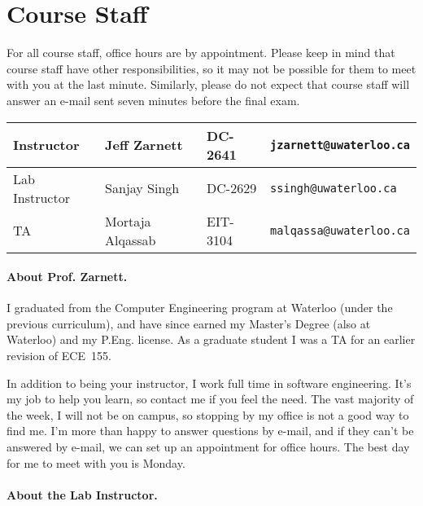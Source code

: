 \documentclass[letterpaper,10pt]{article}
\begin{document}
\section*{Course Staff}

For all course staff, office hours are by appointment. Please keep in mind that course staff have other responsibilities, so it may not be possible for them to meet with you at the last minute. Similarly, please do not expect that course staff will answer an e-mail sent seven minutes before the final exam.

\begin{table}[h]
        \begin{center}
        \begin{tabular}{l|l|l|l}
                                        Instructor & Jeff Zarnett & DC-2641 & \texttt{jzarnett@uwaterloo.ca} \\
                                        \hline
                                        Lab Instructor & Sanjay Singh & DC-2629 & \texttt{ssingh@uwaterloo.ca}\\
                                        \hline

                                    TA & Mortaja Alqassab & EIT-3104 & \texttt{malqassa@uwaterloo.ca} \\
                                                   \end{tabular}
        \end{center}
\end{table}


\paragraph{About Prof. Zarnett.}
I graduated from the Computer Engineering program at Waterloo (under the previous curriculum), and have since earned my Master's Degree (also at Waterloo) and my P.Eng. license. As a graduate student I was a TA for an earlier revision of ECE~155.

In addition to being your instructor, I work full time in software engineering. It's my job to help you learn, so contact me if you feel the need. The vast majority of the week, I will not be on campus, so stopping by my office is not a good way to find me. I'm more than happy to answer questions by e-mail, and if they can't be answered by e-mail, we can set up an appointment for office hours. The best day for me to meet with you is Monday.

\paragraph{About the Lab Instructor.}
\end{document}
